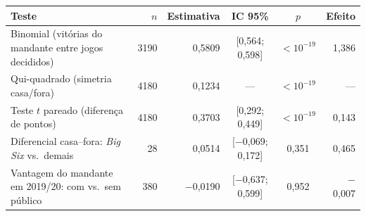 \begin{tabular}{lrrccr}
  \toprule
  Teste & $n$ & Estimativa & IC 95\% & $p$ & Efeito \\
  \midrule
  Binomial (vitórias do mandante entre jogos decididos) & 3190 & 0,5809 & [0,564; 0,598] & $<10^{-19}$ & 1,386 \\
  Qui-quadrado (simetria casa/fora) & 4180 & 0,1234 & --- & $<10^{-19}$ & --- \\
  Teste $t$ pareado (diferença de pontos) & 4180 & 0,3703 & [0,292; 0,449] & $<10^{-19}$ & 0,143 \\
  Diferencial casa--fora: \textit{Big Six} vs.\ demais & 28 & 0,0514 & [$-$0,069; 0,172] & 0,351 & 0,465 \\
  Vantagem do mandante em 2019/20: com vs.\ sem público & 380 & $-$0,0190 & [$-$0,637; 0,599] & 0,952 & $-$0,007 \\
  \bottomrule
\end{tabular}
